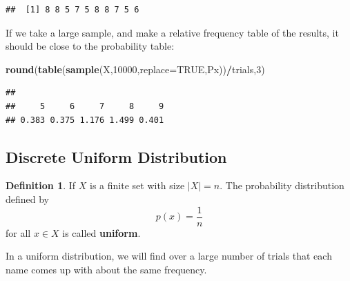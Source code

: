 \documentclass[
]{book}
\newenvironment{Shaded}{\begin{snugshade}}{\end{snugshade}}
\newcommand{\AttributeTok}[1]{\textcolor[rgb]{0.13,0.29,0.53}{#1}}
\newcommand{\ConstantTok}[1]{\textcolor[rgb]{0.56,0.35,0.01}{#1}}
\newcommand{\DecValTok}[1]{\textcolor[rgb]{0.00,0.00,0.81}{#1}}
\newcommand{\FunctionTok}[1]{\textcolor[rgb]{0.13,0.29,0.53}{\textbf{#1}}}
\newcommand{\NormalTok}[1]{#1}
\newcommand{\SpecialCharTok}[1]{\textcolor[rgb]{0.81,0.36,0.00}{\textbf{#1}}}
\theoremstyle{definition}
\newtheorem{definition}{Definition}[chapter]
\theoremstyle{definition}
\theoremstyle{definition}
\theoremstyle{definition}
\theoremstyle{remark}
\begin{document}
\begin{verbatim}
##  [1] 8 8 5 7 5 8 8 7 5 6
\end{verbatim}

If we take a large sample, and make a relative frequency table of the results, it should be close to the probability table:

\begin{Shaded}
\begin{Highlighting}[]
\FunctionTok{round}\NormalTok{(}\FunctionTok{table}\NormalTok{(}\FunctionTok{sample}\NormalTok{(X,}\DecValTok{10000}\NormalTok{,}\AttributeTok{replace=}\ConstantTok{TRUE}\NormalTok{,Px))}\SpecialCharTok{/}\NormalTok{trials,}\DecValTok{3}\NormalTok{)}
\end{Highlighting}
\end{Shaded}

\begin{verbatim}
## 
##     5     6     7     8     9 
## 0.383 0.375 1.176 1.499 0.401
\end{verbatim}

\subsection{Discrete Uniform Distribution}\label{discrete-uniform-distribution}

\begin{definition}
\protect\hypertarget{def:discrete-uniform}{}\label{def:discrete-uniform}If \(X\) is a finite set with size \(|X| = n\). The probability distribution defined by \[p(x) = \frac{1}{n}\] for all \(x \in X\) is called \textbf{uniform}.
\end{definition}

In a uniform distribution, we will find over a large number of trials that each name comes up with about the same frequency.
\end{document}
